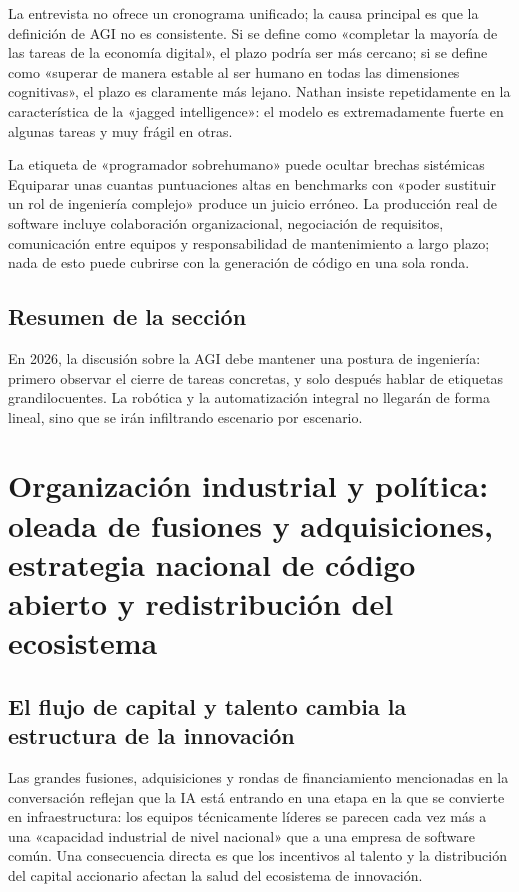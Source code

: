\documentclass[a4paper]{article}
\begin{document}
La entrevista no ofrece un cronograma unificado; la causa principal es que la definición de AGI no es consistente. Si se define como «completar la mayoría de las tareas de la economía digital», el plazo podría ser más cercano; si se define como «superar de manera estable al ser humano en todas las dimensiones cognitivas», el plazo es claramente más lejano. Nathan insiste repetidamente en la característica de la «jagged intelligence»: el modelo es extremadamente fuerte en algunas tareas y muy frágil en otras.

\begin{warningbox}{La etiqueta de «programador sobrehumano» puede ocultar brechas sistémicas}
Equiparar unas cuantas puntuaciones altas en benchmarks con «poder sustituir un rol de ingeniería complejo» produce un juicio erróneo. La producción real de software incluye colaboración organizacional, negociación de requisitos, comunicación entre equipos y responsabilidad de mantenimiento a largo plazo; nada de esto puede cubrirse con la generación de código en una sola ronda.
\end{warningbox}

\subsection{Resumen de la sección}

En 2026, la discusión sobre la AGI debe mantener una postura de ingeniería: primero observar el cierre de tareas concretas, y solo después hablar de etiquetas grandilocuentes. La robótica y la automatización integral no llegarán de forma lineal, sino que se irán infiltrando escenario por escenario.
\section{Organización industrial y política: oleada de fusiones y adquisiciones, estrategia nacional de código abierto y redistribución del ecosistema}

\subsection{El flujo de capital y talento cambia la estructura de la innovación}

Las grandes fusiones, adquisiciones y rondas de financiamiento mencionadas en la conversación reflejan que la IA está entrando en una etapa en la que se convierte en infraestructura: los equipos técnicamente líderes se parecen cada vez más a una «capacidad industrial de nivel nacional» que a una empresa de software común. Una consecuencia directa es que los incentivos al talento y la distribución del capital accionario afectan la salud del ecosistema de innovación.
\end{document}
